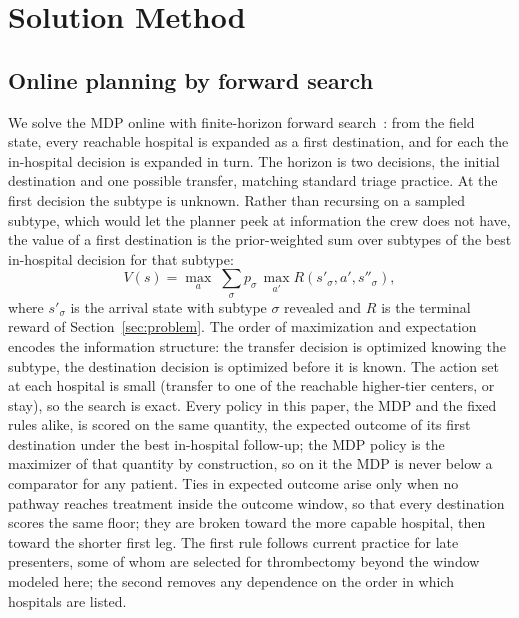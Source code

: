 \section{Solution Method}
\label{sec:method}

\subsection{Online planning by forward search}
We solve the MDP online with finite-horizon forward search~\cite{kochenderfer2022}: from the field state, every reachable hospital is expanded as a first destination, and for each the in-hospital decision is expanded in turn. The horizon is two decisions, the initial destination and one possible transfer, matching standard triage practice. At the first decision the subtype is unknown. Rather than recursing on a sampled subtype, which would let the planner peek at information the crew does not have, the value of a first destination is the prior-weighted sum over subtypes of the best in-hospital decision for that subtype:
\begin{equation}
V(s) = \max_{a} \; \sum_{\sigma} p_\sigma \, \max_{a'} R(s'_\sigma, a', s''_\sigma),
\label{eq:expectimax}
\end{equation}
where $s'_\sigma$ is the arrival state with subtype $\sigma$ revealed and $R$ is the terminal reward of Section~\ref{sec:problem}. The order of maximization and expectation encodes the information structure: the transfer decision is optimized knowing the subtype, the destination decision is optimized before it is known. The action set at each hospital is small (transfer to one of the reachable higher-tier centers, or stay), so the search is exact. Every policy in this paper, the MDP and the fixed rules alike, is scored on the same quantity, the expected outcome of its first destination under the best in-hospital follow-up; the MDP policy is the maximizer of that quantity by construction, so on it the MDP is never below a comparator for any patient. Ties in expected outcome arise only when no pathway reaches treatment inside the outcome window, so that every destination scores the same floor; they are broken toward the more capable hospital, then toward the shorter first leg. The first rule follows current practice for late presenters, some of whom are selected for thrombectomy beyond the window modeled here; the second removes any dependence on the order in which hospitals are listed.

